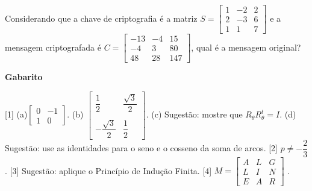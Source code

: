 \documentclass[12pt,a4paper]{article}
\begin{document}
\begin{enumerate}
  Considerando que a chave de criptografia é a matriz
    $S=\begin{bmatrix}
      1 & -2 & 2\\
      2 & -3 & 6\\
      1 & 1 & 7
    \end{bmatrix}$ e a mensagem criptografada é
    $C=\begin{bmatrix}
      -13 & -4 & 15 \\
      -4 & 3 & 80 \\
      48 & 28 & 147
      \end{bmatrix}$, qual é a mensagem original?

\end{enumerate}
  
\begin{center}
  \textbf{Gabarito}
\end{center}

[1] (a)$\begin{bmatrix}
        0 & -1  \\
        1 & 0
      \end{bmatrix}$. 
(b) $\begin{bmatrix}
        \dfrac{1}{2} & \dfrac{\sqrt{3}}{2}  \\ \\
        -\dfrac{\sqrt{3}}{2} & \dfrac{1}{2}
      \end{bmatrix}$. 
(c) Sugestão: mostre que $R_\theta R_\theta^t = I$. 
(d) Sugestão: use as identidades para o seno e o cosseno da soma de arcos. 
[2] $p \neq -\dfrac{2}{3}$. 
[3] Sugestão: aplique o Princípio de Indução Finita. 
[4] $M =
  \begin{bmatrix}
    A & L & G \\
    L & I & N \\
    E & A & R
  \end{bmatrix}$ .
\end{document}

